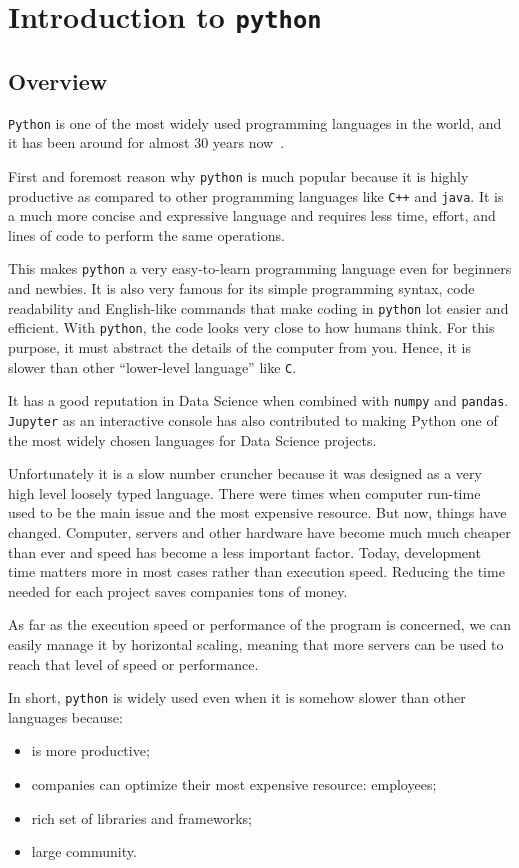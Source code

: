 \chapter{Introduction to \texttt{python}}
\label{introduction-to-python}

\section{Overview}
\texttt{Python} is one of the most widely used programming languages in the world, and it has been around for almost 30 years now~\cite{survey2021}.

First and foremost reason why \texttt{python} is much popular because it is highly productive as compared to other programming languages like \texttt{C++} and \texttt{java}. It is a much more concise and expressive language and requires less time, effort, and lines of code to perform the same operations.

This makes \texttt{python} a very easy-to-learn programming language even for beginners and newbies. It is also very famous for its simple programming syntax, code readability and English-like commands that make coding in \texttt{python} lot easier and efficient.
With \texttt{python}, the code looks very close to how humans think. For this purpose, it must abstract the details of the computer from you. Hence, it is slower than other “lower-level language” like \texttt{C}.

It has a good reputation in Data Science when combined with \texttt{numpy} and \texttt{pandas}. \texttt{Jupyter} as an interactive console has also contributed to making Python one of the most widely chosen languages for Data Science projects. 

Unfortunately it is a slow number cruncher because it was designed as a very high level loosely typed language. 
There were times when computer run-time used to be the main issue and the most expensive resource. But now, things have changed. Computer, servers and other hardware have become much much cheaper than ever and speed has become a less important factor. Today, development time matters more in most cases rather than execution speed. Reducing the time needed for each project saves companies tons of money.

As far as the execution speed or performance of the program is concerned, we can easily manage it by horizontal scaling, meaning that more servers can be used to reach that level of speed or performance.

In short, \texttt{python} is widely used even when it is somehow slower than other languages because:
\begin{itemize}
\tightlist
\item is more productive;
\item companies can optimize their most expensive resource: employees;
\item rich set of libraries and frameworks;
\item large community.
\end{itemize}

